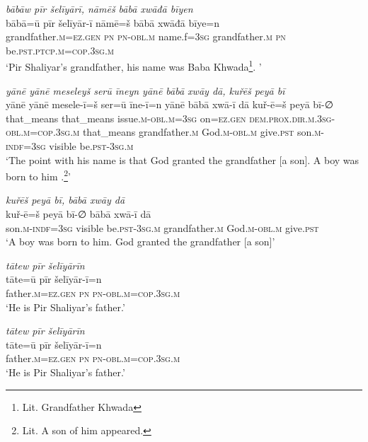 \ea \label{BP.2}
\textit{bābāw pīr šelīyārī, nāmēš bābā xwāđā bīyen} \\ 
\gll bābā=ū pīr šelīyār-ī nāmē=š bābā xwāđā bīye=n \\ 
 grandfather\textsc{.m}\textsc{=ez.gen} \textsc{pn} \textsc{pn}\textsc{-obl}\textsc{.m} name.f\textsc{=3sg} grandfather\textsc{.m} \textsc{pn} be\textsc{.pst}\textsc{.ptcp}\textsc{.m}\textsc{=cop}\textsc{.3sg}\textsc{.m} \\ 
\glt `Pir Shaliyar’s grandfather, his name was Baba Khwada\footnote{Lit. Grandfather Khwada}. '
\z 
 
\ea \label{BP.3}
\textit{yānē yānē meseleyš serū īneyn yānē bābā xwāy dā, kuřēš peyā bī} \\ 
\gll yānē yānē mesele-ī=š ser=ū īne-ī=n yānē bābā xwā-ī dā kuř-ē=š peyā bī-∅ \\ 
 that\_means that\_means issue\textsc{.m}\textsc{-obl}\textsc{.m}\textsc{=3sg} on\textsc{=ez.gen} \textsc{dem.prox}\textsc{.dir}\textsc{.m}\textsc{.3sg}\textsc{-obl}\textsc{.m}\textsc{=cop}\textsc{.3sg}\textsc{.m} that\_means grandfather\textsc{.m} God\textsc{.m}\textsc{-obl}\textsc{.m} give\textsc{.pst} son\textsc{.m}\textsc{-indf}\textsc{=3sg} visible be\textsc{.pst}\textsc{-3sg}\textsc{.m} \\ 
\glt `The point with his name is that God granted the grandfather [a son]. A boy  was born to him .\footnote{Lit. A son of him appeared.}'
\z 
 
\ea \label{BP.4}
\textit{kuřēš peyā bī, bābā xwāy dā} \\ 
\gll kuř-ē=š peyā bī-∅ bābā xwā-ī dā \\ 
 son\textsc{.m}\textsc{-indf}\textsc{=3sg} visible be\textsc{.pst}\textsc{-3sg}\textsc{.m} grandfather\textsc{.m} God\textsc{.m}\textsc{-obl}\textsc{.m} give\textsc{.pst} \\ 
\glt `A boy  was born to him. God granted the grandfather [a son]'
\z 
 
\ea \label{BP.7}
\textit{tātew pīr šelīyārīn} \\ 
\gll tāte=ū pīr šelīyār-ī=n \\ 
 father\textsc{.m}\textsc{=ez.gen} \textsc{pn} \textsc{pn}\textsc{-obl}\textsc{.m}\textsc{=cop}\textsc{.3sg}\textsc{.m} \\ 
\glt `He is Pir Shaliyar’s father.'
\z 
 
\ea \label{BP.8}
\textit{tātew pīr šelīyārīn} \\ 
\gll tāte=ū pīr šelīyār-ī=n \\ 
 father\textsc{.m}\textsc{=ez.gen} \textsc{pn} \textsc{pn}\textsc{-obl}\textsc{.m}\textsc{=cop}\textsc{.3sg}\textsc{.m} \\ 
\glt `He is Pir Shaliyar’s father.'
\z 
 

